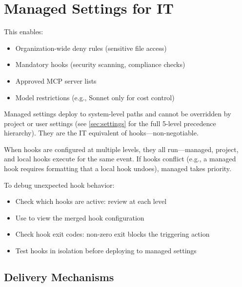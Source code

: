\section{Managed Settings for IT}
\label{sec:managed-settings}

 This enables:

\begin{itemize}
  \item Organization-wide deny rules (sensitive file access)
  \item Mandatory hooks (security scanning, compliance checks)
  \item Approved MCP server lists
  \item Model restrictions (e.g., Sonnet only for cost control)
\end{itemize}

Managed settings deploy to system-level paths and cannot be overridden
by project or user settings (see \cref{sec:settings} for the full 5-level
precedence hierarchy). They are the IT equivalent of hooks---non-negotiable.

\begin{tipbox}
When hooks are configured at multiple levels, they all run---managed,
project, and local hooks execute for the same event. If hooks conflict
(e.g., a managed hook requires formatting that a local hook undoes),
managed takes priority.

To debug unexpected hook behavior:
\begin{itemize}
  \item Check which hooks are active: review  at each level
  \item Use  to view the merged hook configuration
  \item Check hook exit codes: non-zero exit blocks the triggering action
  \item Test hooks in isolation before deploying to managed settings
\end{itemize}
\end{tipbox}

\subsection*{Delivery Mechanisms}

